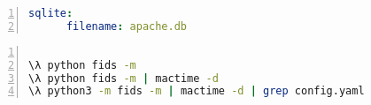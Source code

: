 \begin{lstlisting}[language=yaml, numbers=left, caption=Database Config, label=lst:example:timelineconf]
  sqlite:
      filename: apache.db

\end{lstlisting}

\begin{lstlisting}[language=bash, numbers=left, caption=Timeliner Example, label=lst:example:exampletimeliner]

\λ python fids -m
\λ python fids -m | mactime -d
\λ python3 -m fids -m | mactime -d | grep config.yaml
\end{lstlisting}